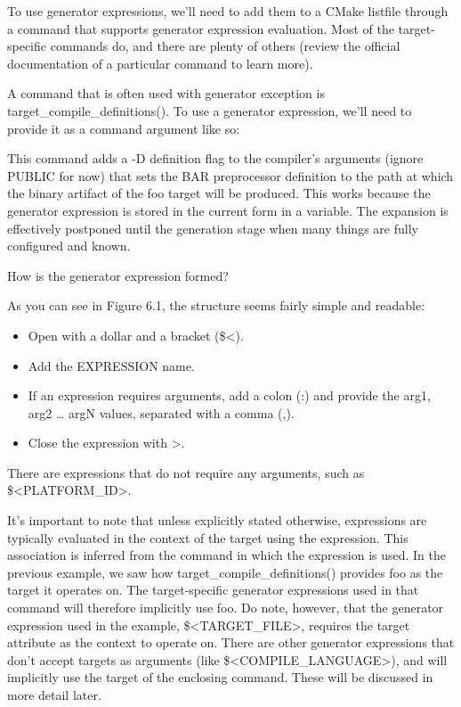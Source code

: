 
To use generator expressions, we’ll need to add them to a CMake listfile through a command that supports generator expression evaluation. Most of the target-specific commands do, and there are plenty of others (review the official documentation of a particular command to learn more).

A command that is often used with generator exception is target\_compile\_definitions(). To use a generator expression, we’ll need to provide it as a command argument like so:


This command adds a -D definition flag to the compiler’s arguments (ignore PUBLIC for now) that sets the BAR preprocessor definition to the path at which the binary artifact of the foo target will be produced. This works because the generator expression is stored in the current form in a variable. The expansion is effectively postponed until the generation stage when many things are fully configured and known.

How is the generator expression formed?


As you can see in Figure 6.1, the structure seems fairly simple and readable:

\begin{itemize}
\item
Open with a dollar and a bracket (\$<).

\item
Add the EXPRESSION name.

\item
If an expression requires arguments, add a colon (:) and provide the arg1, arg2 … argN values, separated with a comma (,).

\item
Close the expression with >.
\end{itemize}

There are expressions that do not require any arguments, such as \$<PLATFORM\_ID>.

It’s important to note that unless explicitly stated otherwise, expressions are typically evaluated in the context of the target using the expression. This association is inferred from the command in which the expression is used. In the previous example, we saw how target\_compile\_definitions() provides foo as the target it operates on. The target-specific generator expressions used in that command will therefore implicitly use foo. Do note, however, that the generator expression used in the example, \$<TARGET\_FILE>, requires the target attribute as the context to operate on. There are other generator expressions that don’t accept targets as arguments (like \$<COMPILE\_LANGUAGE>), and will implicitly use the target of the enclosing command. These will be discussed in more detail later.

